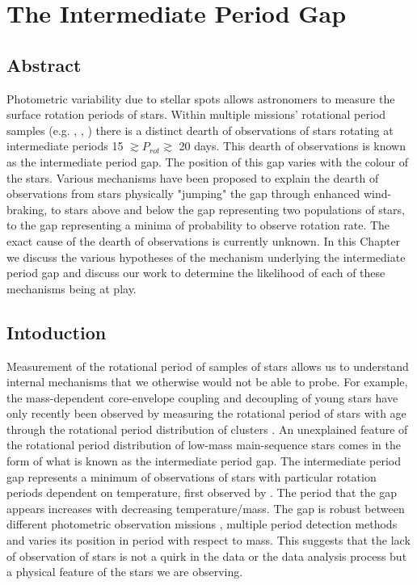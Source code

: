 

\newcommand\rper{$R_{\rm{per}}$}




\chapter{The Intermediate Period Gap}

\section*{Abstract}


Photometric variability due to stellar spots allows astronomers to measure the surface rotation periods of stars.
Within multiple missions' rotational period samples (e.g. \kepler, \ktoo, \ZTF) there is a distinct dearth of observations of stars rotating at intermediate periods 15 $\gtrsim P_{rot} \gtrsim$ 20 days.
This dearth of observations is known as the intermediate period gap.
The position of this gap varies with the colour of the stars.
Various mechanisms have been proposed to explain the dearth of observations from stars physically "jumping" the gap through enhanced wind-braking, to stars above and below the gap representing two populations of stars, to the gap representing a minima of probability to observe rotation rate.
The exact cause of the dearth of observations is currently unknown.
In this Chapter we discuss the various hypotheses of the mechanism underlying the intermediate period gap and discuss our work to determine the likelihood of each of these mechanisms being at play.

\newpage

\section{Intoduction}
\label{sec:intro}
Measurement of the rotational period of samples of stars allows us to understand internal mechanisms that we otherwise would not be able to probe.
For example, the mass-dependent core-envelope coupling and decoupling of young stars have only recently been observed by measuring the rotational period of stars with age through the rotational period distribution of clusters \citep{reinhold_rotation_2015-1}.
An unexplained feature of the rotational period distribution of low-mass main-sequence stars comes in the form of what is known as the intermediate period gap.
The intermediate period gap represents a minimum of observations of stars with particular rotation periods dependent on temperature, first observed by \citet{mcquillan_rotation_2014}.
The period that the gap appears increases with decreasing temperature/mass.
The gap is robust between different photometric observation missions \citep{mcquillan_rotation_2014,davenport_rotating_2017,davenport_rotating_2018,lu_bridging_2022}, multiple period detection methods and varies its position in period with respect to mass. 
This suggests that the lack of observation of stars is not a quirk in the data or the data analysis process but a physical feature of the stars we are observing.

